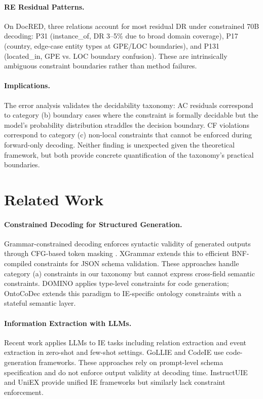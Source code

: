 \documentclass[11pt,a4paper]{article}
\begin{document}
\paragraph{RE Residual Patterns.}
On DocRED, three relations account for most residual DR under constrained 70B decoding: P31 (instance\_of, DR 3--5\% due to broad domain coverage), P17 (country, edge-case entity types at GPE/LOC boundaries), and P131 (located\_in, GPE vs. LOC boundary confusion). These are intrinsically ambiguous constraint boundaries rather than method failures.

\paragraph{Implications.}
The error analysis validates the decidability taxonomy: AC residuals correspond to category (b) boundary cases where the constraint is formally decidable but the model's probability distribution straddles the decision boundary. CF violations correspond to category (c) non-local constraints that cannot be enforced during forward-only decoding. Neither finding is unexpected given the theoretical framework, but both provide concrete quantification of the taxonomy's practical boundaries.

\section{Related Work}

\paragraph{Constrained Decoding for Structured Generation.}
Grammar-constrained decoding enforces syntactic validity of generated outputs through CFG-based token masking \cite{willard2023efficient,geng2024grammarconstrained}. XGrammar extends this to efficient BNF-compiled constraints for JSON schema validation. These approaches handle category (a) constraints in our taxonomy but cannot express cross-field semantic constraints. DOMINO applies type-level constraints for code generation; OntoCoDec extends this paradigm to IE-specific ontology constraints with a stateful semantic layer.

\paragraph{Information Extraction with LLMs.}
Recent work applies LLMs to IE tasks including relation extraction and event extraction in zero-shot and few-shot settings. GoLLIE and CodeIE use code-generation frameworks. These approaches rely on prompt-level schema specification and do not enforce output validity at decoding time. InstructUIE and UniEX provide unified IE frameworks but similarly lack constraint enforcement.
\end{document}

